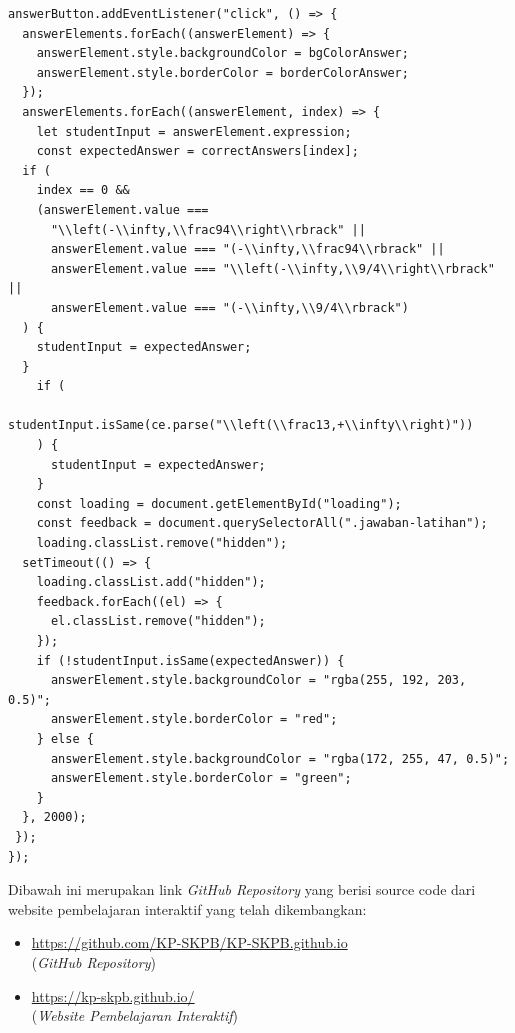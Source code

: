 \documentclass{file/KP-ITS}
\theoremstyle{definition}
\theoremstyle{definition}
\theoremstyle{plain}
\begin{document}
\begin{verbatim}
answerButton.addEventListener("click", () => {
  answerElements.forEach((answerElement) => {
    answerElement.style.backgroundColor = bgColorAnswer;
    answerElement.style.borderColor = borderColorAnswer;
  });
  answerElements.forEach((answerElement, index) => {
    let studentInput = answerElement.expression;
    const expectedAnswer = correctAnswers[index];
  if (
    index == 0 &&
    (answerElement.value ===
      "\\left(-\\infty,\\frac94\\right\\rbrack" ||
      answerElement.value === "(-\\infty,\\frac94\\rbrack" ||
      answerElement.value === "\\left(-\\infty,\\9/4\\right\\rbrack" ||
      answerElement.value === "(-\\infty,\\9/4\\rbrack")
  ) {
    studentInput = expectedAnswer;
  }
    if (
      studentInput.isSame(ce.parse("\\left(\\frac13,+\\infty\\right)"))
    ) {
      studentInput = expectedAnswer;
    }
    const loading = document.getElementById("loading");
    const feedback = document.querySelectorAll(".jawaban-latihan");
    loading.classList.remove("hidden");
  setTimeout(() => {
    loading.classList.add("hidden");
    feedback.forEach((el) => {
      el.classList.remove("hidden");
    });
    if (!studentInput.isSame(expectedAnswer)) {
      answerElement.style.backgroundColor = "rgba(255, 192, 203, 0.5)";
      answerElement.style.borderColor = "red";
    } else {
      answerElement.style.backgroundColor = "rgba(172, 255, 47, 0.5)";
      answerElement.style.borderColor = "green";
    }
  }, 2000);
 });
});
\end{verbatim}
\cleardoublepage
{}
Dibawah ini merupakan link \textit{GitHub Repository} yang berisi source code dari website pembelajaran interaktif yang telah dikembangkan:
\begin{itemize}
    \item \url{https://github.com/KP-SKPB/KP-SKPB.github.io} \\(\textit{GitHub Repository})
    \item \url{https://kp-skpb.github.io/} \\(\textit{Website Pembelajaran Interaktif})
\end{itemize}
\end{document}
